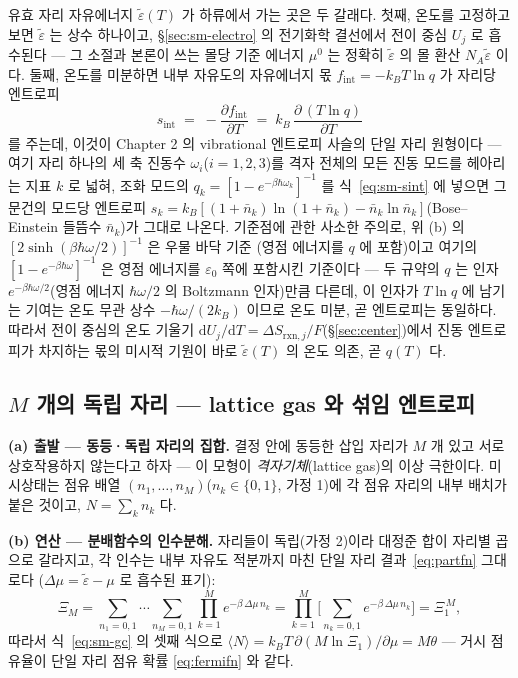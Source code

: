 \documentclass[11pt,a4paper]{article}
\newcommand{\dd}{\mathrm{d}}
\newcommand{\rxn}{\mathrm{rxn}}
\begin{document}
유효 자리 자유에너지 $\tilde\varepsilon(T)$ 가 하류에서 가는 곳은 두 갈래다. 첫째, 온도를 고정하고 보면
$\tilde\varepsilon$ 는 상수 하나이고, \S\ref{sec:sm-electro} 의 전기화학 결선에서 전이 중심 $U_j$ 로
흡수된다 --- 그 소절과 본론이 쓰는 몰당 기준 에너지 $\mu^0$ 는 정확히 $\tilde\varepsilon$ 의 몰 환산
$N_A\tilde\varepsilon$ 이다. 둘째, 온도를 미분하면 내부 자유도의 자유에너지 몫
$f_\mathrm{int}=-k_BT\ln q$ 가 자리당 엔트로피
\begin{equation}
s_\mathrm{int}\;=\;-\frac{\partial f_\mathrm{int}}{\partial T}
\;=\;k_B\,\frac{\partial\,(T\ln q)}{\partial T}
\label{eq:sm-sint}
\end{equation}
를 주는데, 이것이 Chapter 2 의 vibrational 엔트로피 사슬의 단일 자리 원형이다 --- 여기 자리 하나의
세 축 진동수 $\omega_i$($i=1,2,3$)를 격자 전체의 모든 진동 모드를 헤아리는 지표 $k$ 로 넓혀, 조화 모드의
$q_k=[1-e^{-\beta\hbar\omega_k}]^{-1}$ 를 식~\eqref{eq:sm-sint} 에 넣으면 그 문건의 모드당 엔트로피
$s_k=k_B[(1+\bar n_k)\ln(1+\bar n_k)-\bar n_k\ln\bar n_k]$(Bose--Einstein 들뜸수 $\bar n_k$)가 그대로
나온다. 기준점에 관한 사소한 주의로, 위 (b) 의 $[2\sinh(\beta\hbar\omega/2)]^{-1}$ 은 우물 바닥 기준
(영점 에너지를 $q$ 에 포함)이고 여기의 $[1-e^{-\beta\hbar\omega}]^{-1}$ 은 영점 에너지를
$\varepsilon_0$ 쪽에 포함시킨 기준이다 --- 두 규약의 $q$ 는 인자 $e^{-\beta\hbar\omega/2}$(영점 에너지
$\hbar\omega/2$ 의 Boltzmann 인자)만큼 다른데, 이 인자가 $T\ln q$ 에 남기는 기여는 온도 무관 상수
$-\hbar\omega/(2k_B)$ 이므로 온도 미분, 곧 엔트로피는 동일하다. 따라서 전이 중심의 온도 기울기
$\dd U_j/\dd T=\Delta S_{\rxn,j}/F$(\S\ref{sec:center})에서 진동
엔트로피가 차지하는 몫의 미시적 기원이 바로 $\tilde\varepsilon(T)$ 의 온도 의존, 곧 $q(T)$ 다.

\subsection{$M$ 개의 독립 자리 --- lattice gas 와 섞임 엔트로피}\label{sec:sm-lattice}
\textbf{(a) 출발 --- 동등·독립 자리의 집합.} 결정 안에 동등한 삽입 자리가 $M$ 개 있고 서로 상호작용하지
않는다고 하자 --- 이 모형이 \emph{격자기체}(lattice gas)의 이상 극한이다. 미시상태는 점유 배열
$(n_1,\dots,n_M)$($n_k\in\{0,1\}$, 가정 1)에 각 점유 자리의 내부 배치가 붙은 것이고, $N=\sum_kn_k$ 다.

\textbf{(b) 연산 --- 분배함수의 인수분해.} 자리들이 독립(가정 2)이라 대정준 합이 자리별 곱으로 갈라지고,
각 인수는 내부 자유도 적분까지 마친 단일 자리 결과~\eqref{eq:partfn} 그대로다
($\Delta\mu=\tilde\varepsilon-\mu$ 로 흡수된 표기):
\begin{equation}
\Xi_M=\sum_{n_1=0,1}\!\cdots\!\sum_{n_M=0,1}\prod_{k=1}^{M}e^{-\beta\,\Delta\mu\,n_k}
=\prod_{k=1}^{M}\Big[\sum_{n_k=0,1}e^{-\beta\,\Delta\mu\,n_k}\Big]=\Xi_1^{\,M},
\label{eq:sm-factor}
\end{equation}
따라서 식~\eqref{eq:sm-gc} 의 셋째 식으로 $\langle N\rangle=k_BT\,\partial(M\ln\Xi_1)/\partial\mu=M\theta$ ---
거시 점유율이 단일 자리 점유 확률 \eqref{eq:fermifn} 와 같다.
\end{document}
